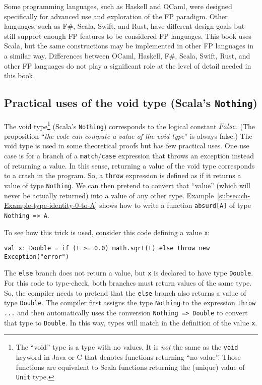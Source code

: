 Some programming languages, such as Haskell and OCaml, were designed
specifically for advanced use and exploration of the FP paradigm.
Other languages, such as F\#, Scala, Swift, and Rust, have different
design goals but still support enough FP features to be considered
FP languages. This book uses Scala, but the same constructions may
be implemented in other FP languages in a similar way. Differences
between OCaml, Haskell, F\#, Scala, Swift, Rust, and other FP languages
do not play a significant role at the level of detail needed in this
book.

\subsection{Practical uses of the void type (Scala\textsf{'}s \texttt{Nothing})}

The void type\footnote{The \textsf{``}void\textsf{''} type is a type with no values. It is \emph{not} the
same as the \lstinline!void! keyword in Java or C that denotes functions
returning \textsf{``}no value\textsf{''}. Those functions are equivalent to Scala
functions returning the (unique) value of \lstinline!Unit! type.} (Scala\textsf{'}s \lstinline!Nothing!) corresponds to the logical constant
$False$. (The proposition \textsf{``}\emph{the code can compute a value of
the void type}\textsf{''} is always false.) The void type is used in some
theoretical proofs but has few practical uses. One use case is for
a branch of a \lstinline!match!/\lstinline!case! expression that
throws an exception instead of returning a value.
In this sense, returning a value of the void type corresponds to a
crash in the program. So, a \lstinline!throw! expression is defined
as if it returns a value of type \lstinline!Nothing!. We can then
pretend to convert that \textsf{``}value\textsf{''} (which will never be actually
returned) into a value of any other type. Example~\ref{subsec:ch-Example-type-identity-0-to-A}
shows how to write a function \lstinline!absurd[A]! of type \lstinline!Nothing => A!.

To see how this trick is used, consider this code defining a value
\lstinline!x!:
\begin{lstlisting}
val x: Double = if (t >= 0.0) math.sqrt(t) else throw new Exception("error")
\end{lstlisting}
The \lstinline!else! branch does not return a value, but \lstinline!x!
is declared to have type \lstinline!Double!. For this code to type-check,
both branches must return values of the same type. So, the compiler
needs to pretend that the \lstinline!else! branch also returns a
value of type \lstinline!Double!. The compiler first assigns the
type \lstinline!Nothing! to the expression \lstinline!throw ...!
and then automatically uses the conversion \lstinline!Nothing => Double!
to convert that type to \lstinline!Double!. In this way, types will
match in the definition of the value \lstinline!x!. 

